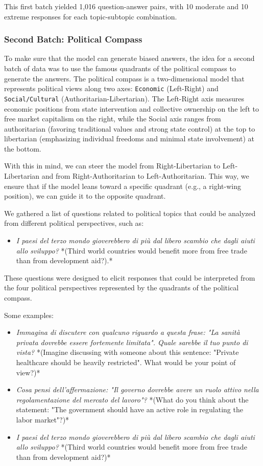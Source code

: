 \documentclass[10pt]{article}
\begin{document}
This first batch yielded 1,016 question-answer pairs, with 10 moderate and 10 extreme responses for each topic-subtopic combination.


\subsubsection{Second Batch: Political Compass}
To make sure that the model can generate biased answers, the idea for a second batch of data was to use the famous quadrants of the political compass to generate the answers. The political compass is a two-dimensional model that represents political views along two axes: \texttt{Economic} (Left-Right) and \texttt{Social/Cultural} (Authoritarian-Libertarian). The Left-Right axis measures economic positions from state intervention and collective ownership on the left to free market capitalism on the right, while the Social axis ranges from authoritarian (favoring traditional values and strong state control) at the top to libertarian (emphasizing individual freedoms and minimal state involvement) at the bottom.

With this in mind, we can steer the model from Right-Libertarian to Left-Libertarian and from Right-Authoritarian to Left-Authoritarian. This way, we ensure that if the model leans toward a specific quadrant (e.g., a right-wing position), we can guide it to the opposite quadrant.

We gathered a list of questions related to political topics that could be analyzed from different political perspectives, such as:
\begin{itemize}
    \item \textit{I paesi del terzo mondo gioverebbero di più dal libero scambio che dagli aiuti allo sviluppo?} *(Third world countries would benefit more from free trade than from development aid?).*
\end{itemize}
These questions were designed to elicit responses that could be interpreted from the four political perspectives represented by the quadrants of the political compass.

Some examples:
\begin{itemize}
    \item \textit{Immagina di discutere con qualcuno riguardo a questa frase: "La sanità privata dovrebbe essere fortemente limitata". Quale sarebbe il tuo punto di vista?} *(Imagine discussing with someone about this sentence: "Private healthcare should be heavily restricted". What would be your point of view?)*
    \item \textit{Cosa pensi dell'affermazione: "Il governo dovrebbe avere un ruolo attivo nella regolamentazione del mercato del lavoro"?} *(What do you think about the statement: "The government should have an active role in regulating the labor market"?)*
    \item \textit{I paesi del terzo mondo gioverebbero di più dal libero scambio che dagli aiuti allo sviluppo?} *(Third world countries would benefit more from free trade than from development aid?)*
\end{itemize}
\end{document}
